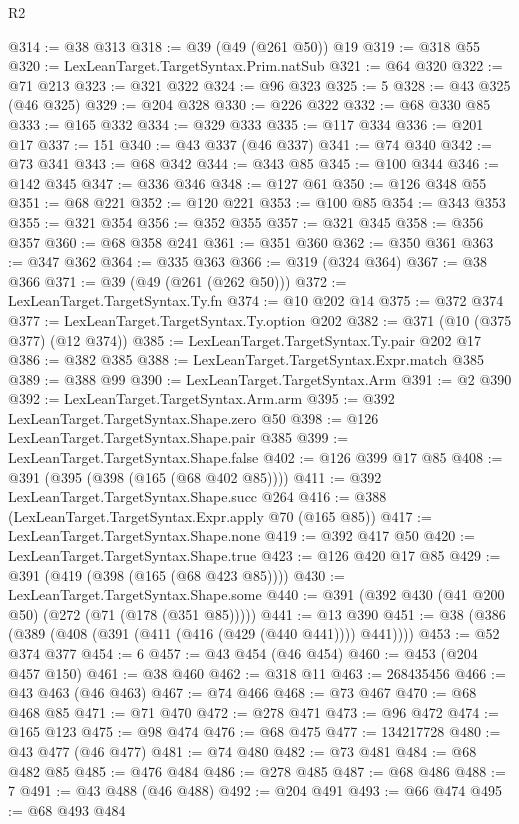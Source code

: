 \begin{lexlean}{R2}
\begin{coremodule}
@314 := @38 @313
@318 := @39 (@49 (@261 @50)) @19
@319 := @318 @55
@320 := LexLeanTarget.TargetSyntax.Prim.natSub
@321 := @64 @320
@322 := @71 @213
@323 := @321 @322
@324 := @96 @323
@325 := 5
@328 := @43 @325 (@46 @325)
@329 := @204 @328
@330 := @226 @322
@332 := @68 @330 @85
@333 := @165 @332
@334 := @329 @333
@335 := @117 @334
@336 := @201 @17
@337 := 151
@340 := @43 @337 (@46 @337)
@341 := @74 @340
@342 := @73 @341
@343 := @68 @342
@344 := @343 @85
@345 := @100 @344
@346 := @142 @345
@347 := @336 @346
@348 := @127 @61
@350 := @126 @348 @55
@351 := @68 @221
@352 := @120 @221
@353 := @100 @85
@354 := @343 @353
@355 := @321 @354
@356 := @352 @355
@357 := @321 @345
@358 := @356 @357
@360 := @68 @358 @241
@361 := @351 @360
@362 := @350 @361
@363 := @347 @362
@364 := @335 @363
@366 := @319 (@324 @364)
@367 := @38 @366
@371 := @39 (@49 (@261 (@262 @50)))
@372 := LexLeanTarget.TargetSyntax.Ty.fn
@374 := @10 @202 @14
@375 := @372 @374
@377 := LexLeanTarget.TargetSyntax.Ty.option @202
@382 := @371 (@10 (@375 @377) (@12 @374))
@385 := LexLeanTarget.TargetSyntax.Ty.pair @202 @17
@386 := @382 @385
@388 := LexLeanTarget.TargetSyntax.Expr.match @385
@389 := @388 @99
@390 := LexLeanTarget.TargetSyntax.Arm
@391 := @2 @390
@392 := LexLeanTarget.TargetSyntax.Arm.arm
@395 := @392 LexLeanTarget.TargetSyntax.Shape.zero @50
@398 := @126 LexLeanTarget.TargetSyntax.Shape.pair @385
@399 := LexLeanTarget.TargetSyntax.Shape.false
@402 := @126 @399 @17 @85
@408 := @391 (@395 (@398 (@165 (@68 @402 @85))))
@411 := @392 LexLeanTarget.TargetSyntax.Shape.succ @264
@416 := @388 (LexLeanTarget.TargetSyntax.Expr.apply @70 (@165 @85))
@417 := LexLeanTarget.TargetSyntax.Shape.none
@419 := @392 @417 @50
@420 := LexLeanTarget.TargetSyntax.Shape.true
@423 := @126 @420 @17 @85
@429 := @391 (@419 (@398 (@165 (@68 @423 @85))))
@430 := LexLeanTarget.TargetSyntax.Shape.some
@440 := @391 (@392 @430 (@41 @200 @50) (@272 (@71 (@178 (@351 @85)))))
@441 := @13 @390
@451 := @38 (@386 (@389 (@408 (@391 (@411 (@416 (@429 (@440 @441)))) @441))))
@453 := @52 @374 @377
@454 := 6
@457 := @43 @454 (@46 @454)
@460 := @453 (@204 @457 @150)
@461 := @38 @460
@462 := @318 @11
@463 := 268435456
@466 := @43 @463 (@46 @463)
@467 := @74 @466
@468 := @73 @467
@470 := @68 @468 @85
@471 := @71 @470
@472 := @278 @471
@473 := @96 @472
@474 := @165 @123
@475 := @98 @474
@476 := @68 @475
@477 := 134217728
@480 := @43 @477 (@46 @477)
@481 := @74 @480
@482 := @73 @481
@484 := @68 @482 @85
@485 := @476 @484
@486 := @278 @485
@487 := @68 @486
@488 := 7
@491 := @43 @488 (@46 @488)
@492 := @204 @491
@493 := @66 @474
@495 := @68 @493 @484

\end{coremodule}
\end{lexlean}
